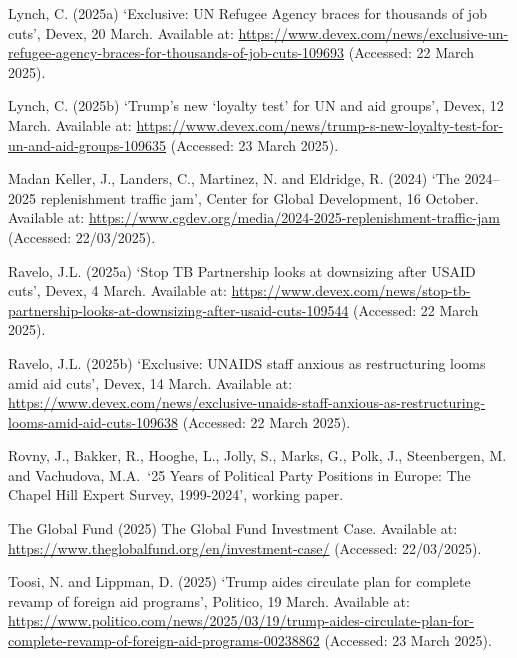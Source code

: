 \documentclass[
]{article}
\begin{document}
Lynch, C. (2025a) `Exclusive: UN Refugee Agency braces for thousands of
job cuts', Devex, 20 March. Available at:
\url{https://www.devex.com/news/exclusive-un-refugee-agency-braces-for-thousands-of-job-cuts-109693}
(Accessed: 22 March 2025).

Lynch, C. (2025b) `Trump's new `loyalty test' for UN and aid groups',
Devex, 12 March. Available at:
\url{https://www.devex.com/news/trump-s-new-loyalty-test-for-un-and-aid-groups-109635}
(Accessed: 23 March 2025).

Madan Keller, J., Landers, C., Martinez, N. and Eldridge, R. (2024) `The
2024--2025 replenishment traffic jam', Center for Global Development, 16
October. Available at:
\url{https://www.cgdev.org/media/2024-2025-replenishment-traffic-jam}
(Accessed: 22/03/2025).

Ravelo, J.L. (2025a) `Stop TB Partnership looks at downsizing after
USAID cuts', Devex, 4 March. Available at:
\url{https://www.devex.com/news/stop-tb-partnership-looks-at-downsizing-after-usaid-cuts-109544}
(Accessed: 22 March 2025).

Ravelo, J.L. (2025b) `Exclusive: UNAIDS staff anxious as restructuring
looms amid aid cuts', Devex, 14 March. Available at:
\url{https://www.devex.com/news/exclusive-unaids-staff-anxious-as-restructuring-looms-amid-aid-cuts-109638}
(Accessed: 22 March 2025).

Rovny, J., Bakker, R., Hooghe, L., Jolly, S., Marks, G., Polk, J.,
Steenbergen, M. and Vachudova, M.A.~`25 Years of Political Party
Positions in Europe: The Chapel Hill Expert Survey, 1999-2024', working
paper.

The Global Fund (2025) The Global Fund Investment Case. Available at:
\url{https://www.theglobalfund.org/en/investment-case/} (Accessed:
22/03/2025).

Toosi, N. and Lippman, D. (2025) `Trump aides circulate plan for
complete revamp of foreign aid programs', Politico, 19 March. Available
at:
\url{https://www.politico.com/news/2025/03/19/trump-aides-circulate-plan-for-complete-revamp-of-foreign-aid-programs-00238862}
(Accessed: 23 March 2025).
\end{document}
